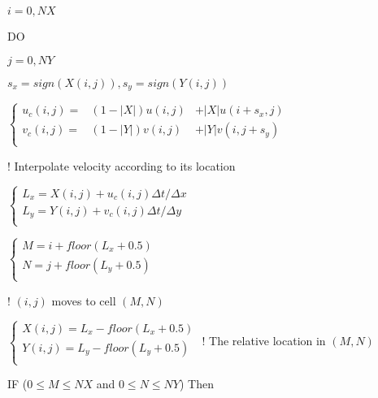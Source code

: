 \documentclass{article}
\theoremstyle{plain}\newtheorem{definition}{\sc{Definition}}
\theoremstyle{defination}\newtheorem{example}{Example}[section]
\numberwithin{equation}{section}
\numberwithin{table}{section}
\begin{document}
{{ 
 { \color{black!80} $i=0,NX$}

\hspace{1.1cm} {\color{black!60!blue!80}DO}
{ \color{black!80} $j=0,NY$

\vspace{0.1cm}
 \hspace{1.5cm} $s_x=sign(X(i,j)), s_y=sign(Y(i,j))$

 \hspace{1.5cm}	$\left\{
  \begin{array}{rlr}
u_c(i,j)=&(1-|X|)u(i,j)&+|X|u(i+s_x,j)\\
v_c(i,j)=&(1-|Y|)v(i,j)&+|Y|v(i,j+s_y)\\
	\end{array}
  \right.$}
 \hspace{0.8cm}
   \color{black!60} ! Interpolate velocity according to its location \color{black!80}

 \hspace{1.5cm}	$\left\{
  \begin{array}{l}
	L_x=X(i,j)+u_c(i,j)\Delta t/ \Delta x\\
    L_y=Y(i,j)+v_c(i,j)\Delta t/ \Delta y\\
	\end{array}
	\right.$

 \hspace{1.5cm}	$\left\{
  \begin{array}{l}
	M=i+floor(L_x+0.5)\\
    N=j+floor(L_y+0.5)\\
	\end{array}
  \right.$}
  { \color{black!60} \hspace{3.4cm}
! $(i,j)$ moves to cell $(M,N)$} {\color{black!80}

 \hspace{1.5cm}	$\left\{
  \begin{array}{l}
	X(i,j)=L_x-floor(L_x+0.5)\\
    Y(i,j)=L_y-floor(L_y+0.5)\\
	\end{array}
	\right.$
	{ \color{black!60} \hspace{2.6cm}
! The relative location in $(M,N)$} {\color{black!80}

\vspace{0.1cm}
\hspace{1.5cm} \color{black!60!blue!80} IF
\color{black!70} ($0 \leqslant M \leqslant NX$ and $0 \leqslant N \leqslant NY$)
\color{black!60!blue!80} Then
\color{black!80}
\vspace{0.1cm}

}}}
\end{document}
